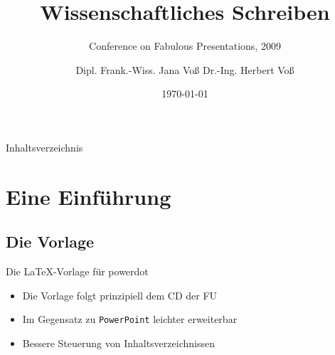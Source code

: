 \documentclass[english,ngerman]{FUpowerdot}
\begin{document}
\title{Wissenschaftliches Schreiben}
\subtitle{Conference on Fabulous Presentations, 2009}
\author{Dipl. Frank.-Wiss. Jana Voß \qquad Dr.-Ing. Herbert Voß}
\date{\today}
\maketitle

\begin{slide}[toc=]{Inhaltsverzeichnis}
\tableofcontents
\end{slide}

\section{Eine Einführung}
\subsection{Die Vorlage}
\begin{slide}{Die \LaTeX-Vorlage für powerdot}
\begin{itemize}[type=1]
\item Die Vorlage folgt prinzipiell dem CD der FU
\item Im Gegensatz zu \texttt{PowerPoint} leichter erweiterbar
\item Bessere Steuerung von Inhaltsverzeichnissen
\end{itemize}
\end{slide}
\end{document}
